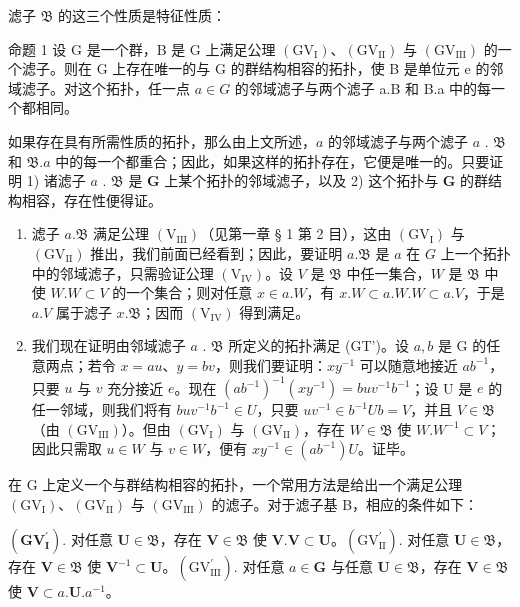 滤子 \(\mathfrak{B}\) 的这三个性质是特征性质：

命题 1 设 G 是一个群，B 是 G 上满足公理 \((\mathrm{GV}_{\mathrm{I}})\)、\((\mathrm{GV}_{\mathrm{II}})\) 与 \((\mathrm{GV}_{\mathrm{III}})\) 的一个滤子。则在 G 上存在唯一的与 G 的群结构相容的拓扑，使 B 是单位元 e 的邻域滤子。对这个拓扑，任一点 \(a \in G\) 的邻域滤子与两个滤子 a.B 和 B.a 中的每一个都相同。

如果存在具有所需性质的拓扑，那么由上文所述，\(a\) 的邻域滤子与两个滤子 \(a\) . \(\mathfrak{B}\) 和 \(\mathfrak{B}.a\) 中的每一个都重合；因此，如果这样的拓扑存在，它便是唯一的。只要证明 1) 诸滤子 \(a\) . \(\mathfrak{B}\) 是 \(\mathbf{G}\) 上某个拓扑的邻域滤子，以及 2) 这个拓扑与 \(\mathbf{G}\) 的群结构相容，存在性便得证。

\begin{enumerate}
\def\labelenumi{\arabic{enumi})}
\item
  滤子 \(a. \mathfrak{B}\) 满足公理 \((\mathrm{V}_{\mathrm{III}})\)（见第一章 § 1 第 2 目），这由 \((\mathrm{GV}_{\mathrm{I}})\) 与 \((\mathrm{GV}_{\mathrm{II}})\) 推出，我们前面已经看到；因此，要证明 \(a. \mathfrak{B}\) 是 \(a\) 在 \(G\) 上一个拓扑中的邻域滤子，只需验证公理 \((\mathrm{V}_{\mathrm{IV}})\)。设 \(V\) 是 \(\mathfrak{B}\) 中任一集合，\(W\) 是 \(\mathfrak{B}\) 中使 \(W.W \subset V\) 的一个集合；则对任意 \(x \in a.W\)，有 \(x.W \subset a.W.W \subset a.V\)，于是 \(a.V\) 属于滤子 \(x. \mathfrak{B}\)；因而 \((\mathrm{V}_{\mathrm{IV}})\) 得到满足。
\item
  我们现在证明由邻域滤子 \(a\) . \(\mathfrak{B}\) 所定义的拓扑满足 (GT')。设 \(a, b\) 是 G 的任意两点；若令 \(x = au\)、\(y = bv\)，则我们要证明：\(xy^{-1}\) 可以随意地接近 \(ab^{-1}\)，只要 \(u\) 与 \(v\) 充分接近 \(e\)。现在 \((ab^{-1})^{-1}(xy^{-1}) = buv^{-1}b^{-1}\)；设 U 是 \(e\) 的任一邻域，则我们将有 \(buv^{-1}b^{-1} \in U\)，只要 \(uv^{-1} \in b^{-1}Ub = V\)，并且 \(V \in \mathfrak{B}\)（由 \((\mathrm{GV}_{\mathrm{III}})\)）。但由 \((\mathrm{GV}_{\mathrm{I}})\) 与 \((\mathrm{GV}_{\mathrm{II}})\)，存在 \(W \in \mathfrak{B}\) 使 \(W.W^{-1} \subset V\)；因此只需取 \(u \in W\) 与 \(v \in W\)，便有 \(xy^{-1} \in (ab^{-1})U\)。证毕。
\end{enumerate}

在 G 上定义一个与群结构相容的拓扑，一个常用方法是给出一个满足公理 \((\mathrm{GV}_{\mathrm{I}})\)、\((\mathrm{GV}_{\mathrm{II}})\) 与 \((\mathrm{GV}_{\mathrm{III}})\) 的滤子。对于滤子基 B，相应的条件如下：

\((\mathbf{GV}_{\mathbf{I}}^{\prime})\). 对任意 \(\mathbf{U}\in \mathfrak{B}\)，存在 \(\mathbf{V}\in \mathfrak{B}\) 使 \(\mathbf{V}.\mathbf{V}\subset \mathbf{U}\)。\((\mathrm{GV}_{\mathrm{II}}^{\prime})\). 对任意 \(\mathbf{U} \in \mathfrak{B}\)，存在 \(\mathbf{V} \in \mathfrak{B}\) 使 \(\mathbf{V}^{-1} \subset \mathbf{U}\)。\((\mathrm{GV}_{\mathrm{III}}^{\prime})\). 对任意 \(a \in \mathbf{G}\) 与任意 \(\mathbf{U} \in \mathfrak{B}\)，存在 \(\mathbf{V} \in \mathfrak{B}\) 使 \(\mathbf{V} \subset a. \mathbf{U}. a^{-1}\)。

